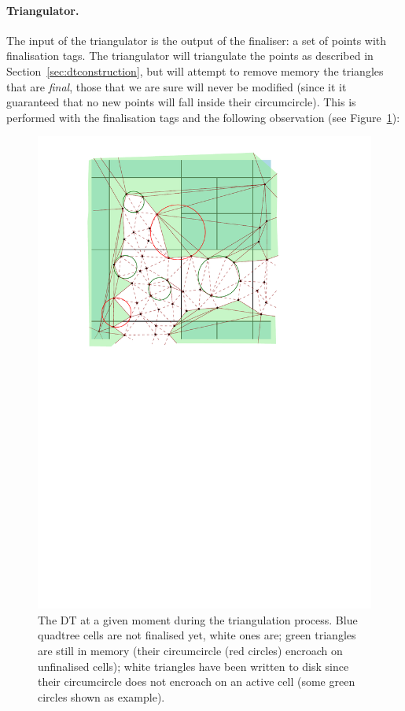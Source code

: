 \paragraph{Triangulator.}
The input of the triangulator is the output of the finaliser: a set of points with finalisation tags.
The triangulator will triangulate the points as described in Section~\ref{sec:dtconstruction}, but will attempt to remove memory the triangles that are \emph{final}, those that we are sure will never be modified (since it it guaranteed that no new points will fall inside their circumcircle).
This is performed with the finalisation tags and the following observation (see Figure~\ref{fig:triangulator}): 
\begin{figure}
  \centering
  \includegraphics[width=\linewidth]{figs/triangulator}
  \caption{The DT at a given moment during the triangulation process. Blue quadtree cells are not finalised yet, white ones are; green triangles are still in memory (their circumcircle (red circles) encroach on unfinalised cells); white triangles have been written to disk since their circumcircle does not encroach on an active cell (some green circles shown as example).}%
\label{fig:triangulator}
\end{figure}
